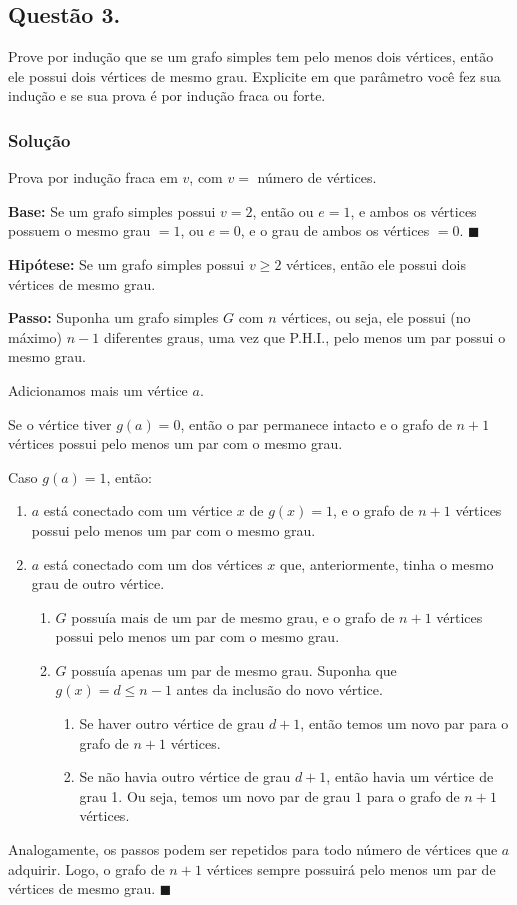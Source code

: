 \documentclass[12pt, letterpaper]{report}
\newcommand*{\CQD}{\hfill\ensuremath{\blacksquare}}%
\newcounter{ProblemNum}
\newcommand*{\anyproblem}[1]{\newpage\subsection*{#1}}
\newcommand*{\problem}[1]{\stepcounter{ProblemNum} %
   \anyproblem{Questão #1}}
\newcommand*{\soln}[1]{\subsubsection*{#1}}
\newcommand*{\solution}{\soln{Solução}}
\begin{document}
\problem{3.}
Prove por indução que se um grafo simples tem pelo menos dois vértices, então ele possui dois vértices de mesmo grau. Explicite em que parâmetro você fez sua indução e se sua prova é por indução fraca ou forte.

\solution
  Prova por indução fraca em $v$, com $v =$ número de vértices.

  \textbf{Base:} Se um grafo simples possui $v = 2$, então ou $e = 1$, e ambos os vértices possuem o mesmo grau $= 1$, ou $e = 0$, e o grau de ambos os vértices $= 0$. \CQD

  \textbf{Hipótese:} Se um grafo simples possui $v \geq 2$ vértices, então ele possui dois vértices de mesmo grau.

  \textbf{Passo:} Suponha um grafo simples $G$ com $n$ vértices, ou seja, ele possui (no máximo) $n - 1$ diferentes graus, uma vez que P.H.I., pelo menos um par possui o mesmo grau.

  Adicionamos mais um vértice $a$. 

  Se o vértice tiver $g(a) = 0$, então o par permanece intacto e o grafo de $n + 1$ vértices possui pelo menos um par com o mesmo grau.
 
  Caso $g(a) = 1$, então: 

  \begin{enumerate}
    \item $a$ está conectado com um vértice $x$ de $g(x) = 1$, e o grafo de $n + 1$ vértices possui pelo menos um par com o mesmo grau.
    \item $a$ está conectado com um dos vértices $x$ que, anteriormente, tinha o mesmo grau de outro vértice.
      \begin{enumerate}
        \item $G$ possuía mais de um par de mesmo grau, e o grafo de $n + 1$ vértices possui pelo menos um par com o mesmo grau.
        \item $G$ possuía apenas um par de mesmo grau. Suponha que $g(x) = d \leq n - 1$ antes da inclusão do novo vértice.
          \begin{enumerate}
            \item Se haver outro vértice de grau $d + 1$, então temos um novo par para o grafo de $n + 1$ vértices.
            \item Se não havia outro vértice de grau $d + 1$, então havia um vértice de grau 1. Ou seja, temos um novo par de grau $1$ para o grafo de $n + 1$ vértices.
          \end{enumerate}
      \end{enumerate}
  \end{enumerate}

  Analogamente, os passos podem ser repetidos para todo número de vértices que $a$ adquirir. Logo, o grafo de $n + 1$ vértices sempre possuirá pelo menos um par de vértices de mesmo grau. \CQD
\end{document}
